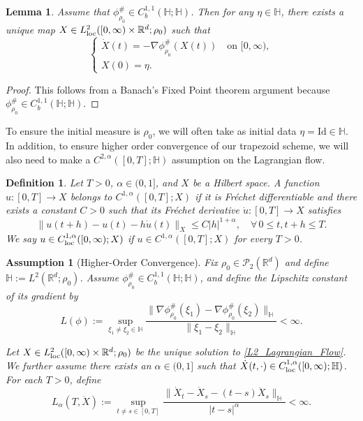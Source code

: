 \documentclass[11pt,a4paper]{amsart}
\newcommand{\1}{\mathds{1}}
\newcommand{\R}{{\mathbb R}}
\newtheorem{lemma}[theorem]{\textbf{Lemma}}
\newtheorem{definition}[theorem]{\textbf{Definition}}
\newtheorem{assumption}{\textbf{Assumption}}
\numberwithin{equation}{section}
\begin{document}
\begin{lemma}
Assume that $\phi^{\#}_{\rho_0} \in C_b^{1,1}(\mathbb{H};\mathbb{H})$. Then for any $\eta \in \mathbb{H}$, there exists a unique map $X \in L^2_{\textnormal{loc}}([0,\infty) \times \R^d;\rho_0)$ such that
\[
\begin{cases} 
\dot{X}(t) = -\nabla \phi^{\#}_{\rho_0}(X(t)) \quad \text{on } [0,\infty), \\ 
X(0) = \eta.
\end{cases}
\]
\end{lemma}

\begin{proof} This follows from a Banach's Fixed Point theorem argument because $\phi^{\#}_{\rho_0} \in C_b^{1,1}(\mathbb{H};\mathbb{H})$.
\end{proof}


To ensure the initial measure is $\rho_0$, we will often take as initial data $\eta = \text{Id} \in \mathbb{H}$. In addition, to ensure higher order convergence of our trapezoid scheme, we will also need to make a $C^{2,\alpha}([0,T];\mathbb{H})$ assumption on the Lagrangian flow.

\begin{definition} \label{C11_X}
Let $T > 0$, $\alpha \in (0,1]$, and $X$ be a Hilbert space. A function $u: [0,T] \to X$ belongs to $C^{1,\alpha}([0,T];X)$ if it is Fréchet differentiable and there exists a constant $C > 0$ such that its Fréchet derivative $\dot{u}: [0,T] \to X$ satisfies  
\begin{equation}
\|u(t+h) - u(t) - h \dot{u}(t)\|_{X} \leq C |h|^{1+\alpha}, \quad \forall \, 0 \leq t, t+h \leq T. \label{time_taylor_expand}
\end{equation}
We say $u \in C^{1,\alpha}_{\textnormal{loc}}([0,\infty);X)$ if $u \in C^{1,\alpha}([0,T];X)$ for every $T > 0$. 
\end{definition}


\begin{assumption}[Higher-Order Convergence]  \label{higher_order_assumption}
Fix $\rho_0 \in \mathcal{P}_2(\R^d)$ and define $\mathbb{H} := L^2(\R^d;\rho_0)$. Assume $\phi^{\#}_{\rho_0} \in C_b^{1,1}(\mathbb{H};\mathbb{H})$, and define the Lipschitz constant of its gradient by
\[ 
L(\phi) := \sup_{\xi_1 \neq \xi_2 \in \mathbb{H}} \frac{\|\nabla \phi^{\#}_{\rho_0}(\xi_1) - \nabla \phi^{\#}_{\rho_0}(\xi_2)\|_{\mathbb{H}}}{\|\xi_1-\xi_2\|_{\mathbb{H}}} < \infty. 
\]

Let $X \in L^2_{\textnormal{loc}}([0,\infty) \times \mathbb{R}^d; \rho_0)$ be the unique solution to \eqref{L2_Lagrangian_Flow}. We further assume there exists an $\alpha \in (0,1]$ such that $\dot{X}(t,\cdot) \in C_{\textnormal{loc}}^{1,\alpha}([0,\infty); \mathbb{H})$. For each $T>0$, define
\begin{equation} 
L_{\alpha}(T,\ddot{X}) := \sup_{t\neq s \in [0,T]} \frac{\|\dot{X}_t - \dot{X}_s - (t-s)\ddot{X}_s\|_{\mathbb{H}}}{|t-s|^{\alpha}} < \infty. 
\label{characteristic_Lipschitz}  
\end{equation}
\end{assumption}
\end{document}
